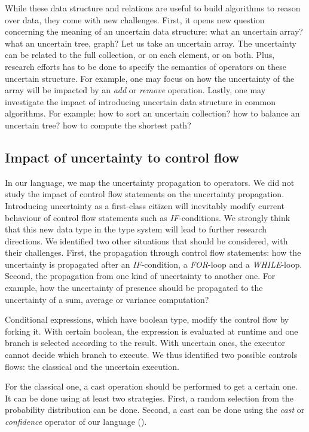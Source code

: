 While these data structure and relations are useful to build algorithms to reason over data, they come with new challenges.
First, it opens new question concerning the meaning of an uncertain data structure: what an uncertain array? what an uncertain tree, graph?
Let us take an uncertain array.
The uncertainty can be related to the full collection, or on each element, or on both.
Plus, research efforts has to be done to specify the semantics of operators on these uncertain structure.
For example, one may focus on how the uncertainty of the array will be impacted by an \textit{add} or \textit{remove} operation.
Lastly, one may investigate the impact of introducing uncertain data structure in common algorithms.
For example: how to sort an uncertain collection? how to balance an uncertain tree? how to compute the shortest path?

\subsection{Impact of uncertainty to control flow}
In our language, we map the uncertainty propagation to operators.
We did not study the impact of control flow statements on the uncertainty propagation.
Introducing uncertainty as a first-class citizen will inevitably modify current behaviour of control flow statements such as \textit{IF}-conditions.
We strongly think that this new data type in the type system will lead to further research directions.
We identified two other situations that should be considered, with their challenges.
First, the propagation through control flow statements: how the uncertainty is propagated after an \textit{IF}-condition, a \textit{FOR}-loop and a \textit{WHILE}-loop.
Second, the propagation from one kind of uncertainty to another one.
For example, how the uncertainty of presence should be propagated to the uncertainty of a sum, average or variance computation?

Conditional expressions, which have boolean type, modify the control flow by forking it.
With certain boolean, the expression is evaluated at runtime and one branch is selected according to the result.
With uncertain ones, the executor cannot decide which branch to execute.
We thus identified two possible controls flows: the classical and the uncertain execution.

For the classical one, a cast operation should be performed to get a certain one.
It can be done using at least two strategies.
First, a random selection from the probability distribution can be done.
Second, a cast can be done using the \textit{cast} or \textit{confidence} operator of our language (\cf {}).

